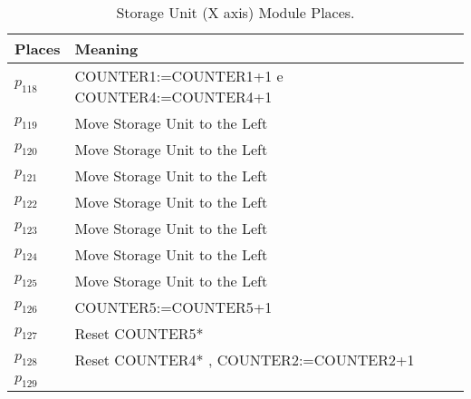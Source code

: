 \begin{table}[H]
\caption{Storage Unit (X axis) Module Places.}
\centering
\begin{tabular}{M{5cm}M{10cm}}
Places & Meaning\\
\hline
\hyperlink{partialNet:p1181}{\hypertarget{partialTable:p118}{$p_{118}$}} & COUNTER1:=COUNTER1+1 e COUNTER4:=COUNTER4+1\\
\hyperlink{partialNet:p1191}{\hypertarget{partialTable:p119}{$p_{119}$}} & Move Storage Unit to the Left\\
\hyperlink{partialNet:p1201}{\hypertarget{partialTable:p120}{$p_{120}$}} & Move Storage Unit to the Left\\
\hyperlink{partialNet:p1211}{\hypertarget{partialTable:p121}{$p_{121}$}} & Move Storage Unit to the Left\\
\hyperlink{partialNet:p1221}{\hypertarget{partialTable:p122}{$p_{122}$}} & Move Storage Unit to the Left\\
\hyperlink{partialNet:p1231}{\hypertarget{partialTable:p123}{$p_{123}$}} & Move Storage Unit to the Left\\
\hyperlink{partialNet:p1241}{\hypertarget{partialTable:p124}{$p_{124}$}} & Move Storage Unit to the Left\\
\hyperlink{partialNet:p1251}{\hypertarget{partialTable:p125}{$p_{125}$}} & Move Storage Unit to the Left\\
\hyperlink{partialNet:p1261}{\hypertarget{partialTable:p126}{$p_{126}$}} & COUNTER5:=COUNTER5+1\\
\hyperlink{partialNet:p1271}{\hypertarget{partialTable:p127}{$p_{127}$}} & Reset COUNTER5*\\
\hyperlink{partialNet:p1281}{\hypertarget{partialTable:p128}{$p_{128}$}} & Reset COUNTER4* , COUNTER2:=COUNTER2+1\\
\hyperlink{partialNet:p1291}{\hypertarget{partialTable:p129}{$p_{129}$}} & \\
\end{tabular}
\end{table}
